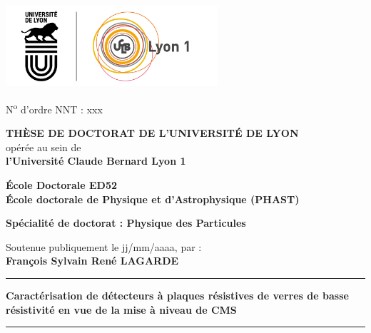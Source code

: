 	\fancyhf{}
	\setlength{\parindent}{0pt}
	\thispagestyle{empty}
	\begin{center}
		\includegraphics[height=3cm]{PG/logo.png} %
	\end{center}
	\vspace{-0.5cm}
	\fontsize{11pt}{13pt}\selectfont
	N\textsuperscript{o} d'ordre NNT : xxx
	
	\vspace{0.5cm}
	
	\begin{center}
		\fontsize{14pt}{16pt}\selectfont
		\textbf{\uppercase{Thèse de doctorat de l'université de Lyon}}\\
		\fontsize{12pt}{14pt}\selectfont
		opérée au sein de\\
		\textbf{l'Université Claude Bernard Lyon 1}
		
		\vspace{0.25cm}
		
		\textbf{École Doctorale ED52\\ École doctorale de Physique et d’Astrophysique (PHAST)}%
		
		\vspace{0.25cm}
		\textbf{Spécialité de doctorat : Physique des Particules}
		\vspace{0.25cm}
		
		Soutenue publiquement le jj/mm/aaaa, par :\\
		\fontsize{14pt}{16pt}\selectfont
		\textbf{François Sylvain René LAGARDE}
	  
		\rule[20pt]{\textwidth}{0.5pt}
		\fontsize{23pt}{26pt}\selectfont
		\textbf{Caractérisation de détecteurs à plaques résistives de verres de basse résistivité en vue de la mise à niveau de CMS}
		\rule{\textwidth}{0.5pt}

	\end{center}
	
